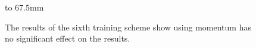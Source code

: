\begin{figure}[p]
    \hbox to 67.5mm{}%
    \caption[The results of the sixth training scheme]{The results of the sixth training scheme show using momentum has no significant effect on the results.}
    \label{fig:training_scheme_6}
\end{figure}

